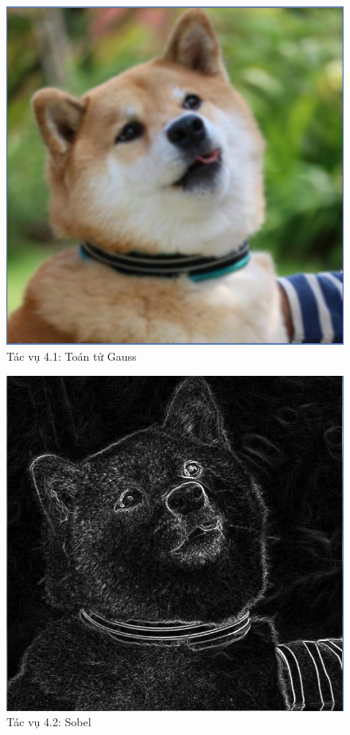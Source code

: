 \documentclass{article}
\begin{document}
	\begin{figure}[H]
		\centering
		\includegraphics[scale = 0.4]{41gauss}
		\caption{Tác vụ 4.1: Toán tử Gauss}
	\end{figure}
	\begin{figure}[H]
		\centering
		\includegraphics[scale = 0.4]{42sobel}
		\caption{Tác vụ 4.2: Sobel}
	\end{figure}
\end{document}

